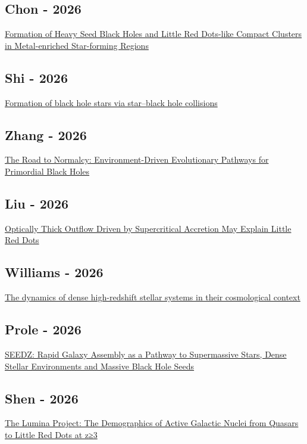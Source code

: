 \documentclass{article}
\begin{document}
\subsection*{Chon - 2026}
\href{https://ui.adsabs.harvard.edu/abs/2026arXiv260900437C/abstract}{Formation of Heavy Seed Black Holes and Little Red Dots-like Compact Clusters in Metal-enriched Star-forming Regions}

\subsection*{Shi - 2026}
\href{https://ui.adsabs.harvard.edu/abs/2026arXiv260827596S/abstract}{Formation of black hole stars via star--black hole collisions}

\subsection*{Zhang - 2026}
\href{https://ui.adsabs.harvard.edu/abs/2026arXiv260823498Z/abstract}{The Road to Normalcy: Environment-Driven Evolutionary Pathways for Primordial Black Holes}

\subsection*{Liu - 2026}
\href{https://ui.adsabs.harvard.edu/abs/2026ApJ..1007L..13L/abstract}{Optically Thick Outflow Driven by Supercritical Accretion May Explain Little Red Dots}

\subsection*{Williams - 2026}
\href{https://ui.adsabs.harvard.edu/abs/2026AAS...24840015W/abstract}{The dynamics of dense high-redshift stellar systems in their cosmological context}

\subsection*{Prole - 2026}
\href{https://ui.adsabs.harvard.edu/abs/2026arXiv260627427P/abstract}{SEEDZ: Rapid Galaxy Assembly as a Pathway to Supermassive Stars, Dense Stellar Environments and Massive Black Hole Seeds}

\subsection*{Shen - 2026}
\href{https://ui.adsabs.harvard.edu/abs/2026arXiv260524112S/abstract}{The Lumina Project: The Demographics of Active Galactic Nuclei from Quasars to Little Red Dots at  z≥3}
\end{document}
